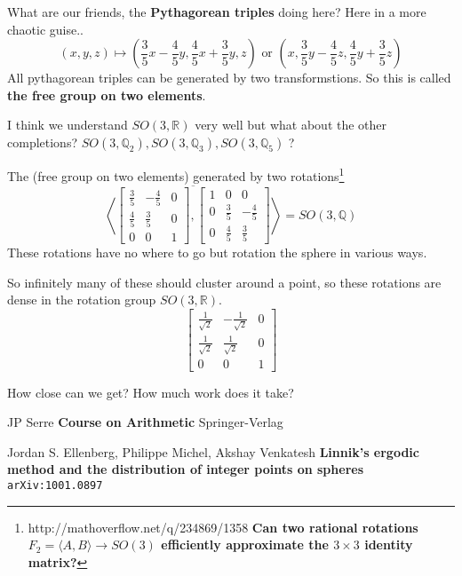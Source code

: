 \documentclass[12pt]{article}
\begin{document}
\noindent  What are our friends, the \textbf{Pythagorean triples} doing here?  Here in a more chaotic guise.. 
$$(x,y,z) \mapsto ( \frac{3}{5}x - \frac{4}{5}y , 
\frac{4}{5}x + \frac{3}{5}y
, z)  \text{ or }
( x, \frac{3}{5}y - \frac{4}{5}z , 
\frac{4}{5}y + \frac{3}{5}z)$$
All pythagorean triples can be generated by two transformstions.  So this is called \textbf{the free group on two elements}.
\newpage

I think we understand $SO(3,\mathbb{R})$ very well but what about the other completions? $SO(3,\mathbb{Q}_2),SO(3,\mathbb{Q}_3),SO(3,\mathbb{Q}_5)$ ? \newline

\noindent The (free group on two elements) generated by two rotations\footnote{http://mathoverflow.net/q/234869/1358 \textbf{Can two rational rotations $F_2 = \langle A, B \rangle \to SO(3)$ efficiently approximate the $3 \times 3$ identity matrix?}}
$$  \overline{ \left \langle {  \left[ \begin{array}{cr|c} 
\frac{3}{5}& -\frac{4}{5} & 0 \\
\frac{4}{5} & \frac{3}{5} & 0 \\ \hline
0 & 0 & 1
\end{array} \right],
\left[ \begin{array}{c|cr} 
1 & 0 & 0 \\ \hline
0 & \frac{3}{5}& -\frac{4}{5}  \\
0 & \frac{4}{5} & \frac{3}{5}  
\end{array} \right] } 
\right \rangle } = SO(3,\mathbb{Q}) $$
These rotations have no where to go but rotation the sphere in various ways. \newline

\noindent So infinitely many of these should cluster around a point, so these rotations are dense in the rotation group $SO(3, \mathbb{R})$.
$$ 
\left[ \begin{array}{cr|c} 
\frac{1}{\sqrt{2}}& -\frac{1}{\sqrt{2}} & 0 \\
\frac{1}{\sqrt{2}} & \frac{1}{\sqrt{2}} & 0 \\ \hline
0 & 0 & 1
\end{array} \right]
$$

How close can we get?  How much work does it take?
\newpage

\selectfont \fontsize{12}{10}\selectfont

\begin{thebibliography}{}

\item JP Serre \textbf{Course on Arithmetic} Springer-Verlag

\item Jordan S. Ellenberg, Philippe Michel, Akshay Venkatesh \newline
\textbf{Linnik's ergodic method and the distribution of integer points on spheres} \texttt{arXiv:1001.0897
}



\end{thebibliography}
\end{document}
